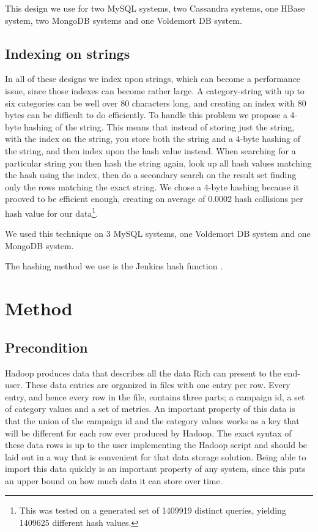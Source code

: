 This design we use for two MySQL systems, two Cassandra systems, one HBase system, two MongoDB systems and one Voldemort DB system.
\section{Indexing on strings}
In all of these designs we index upon strings, which can become a performance issue, since those indexes can become rather large. A category-string with up to six categories can be well over 80 characters long, and creating an index with 80 bytes can be difficult to do efficiently. To handle this problem we propose a 4-byte hashing of the string. This means that instead of storing just the string, with the index on the string, you store both the string and a 4-byte hashing of the string, and then index upon the hash value instead. When searching for a particular string you then hash the string again, look up all hash values matching the hash using the index, then do a secondary search on the result set finding only the rows matching the exact string. We chose a 4-byte hashing because it prooved to be efficient enough, creating on average of 0.0002 hash collisions per hash value for our data\footnote{This was tested on a generated set of 1409919 distinct queries, yielding 1409625 different hash values.}.

We used this technique on 3 MySQL systems, one Voldemort DB system and one MongoDB system.

The hashing method we use is the Jenkins hash function \cite{Jenkins}.
\pagebreak

\chapter{Method}
\section{Precondition}
Hadoop produces data that describes all the data Rich can present to the end-user. These data entries are organized in files with one entry per row. Every entry, and hence every row in the file, contains three parts; a campaign id, a set of category values and a set of metrics. An important property of this data is that the union of the campaign id and the category values works as a key that will be different for each row ever produced by Hadoop. The exact syntax of these data rows is up to the user implementing the Hadoop script and should be laid out in a way that is convenient for that data storage solution. Being able to import this data quickly is an important property of any system, since this puts an upper bound on how much data it can store over time.

